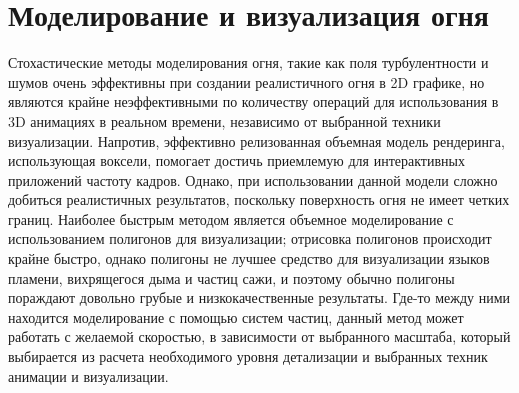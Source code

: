\section{Моделирование и визуализация огня}

Стохастические методы моделирования огня, такие как поля турбулентности и шумов
очень эффективны при создании реалистичного огня в 2D графике, но являются
крайне неэффективными по количеству операций для использования в 3D анимациях в
реальном времени, независимо от выбранной техники визуализации. Напротив,
эффективно релизованная объемная модель рендеринга, использующая воксели,
помогает достичь приемлемую для интерактивных приложений частоту кадров. Однако,
при использовании данной модели сложно добиться реалистичных результатов,
поскольку поверхность огня не имеет четких границ. Наиболее быстрым методом
является объемное моделирование с использованием полигонов для визуализации;
отрисовка полигонов происходит крайне быстро, однако полигоны не лучшее средство
для визуализации языков пламени, вихрящегося дыма и частиц сажи, и поэтому
обычно полигоны пораждают довольно грубые и низкокачественные результаты. Где-то
между ними находится моделирование с помощью систем частиц, данный метод может
работать с желаемой скоростью, в зависимости от выбранного масштаба, который
выбирается из расчета необходимого уровня детализации и выбранных техник
анимации и визуализации.
